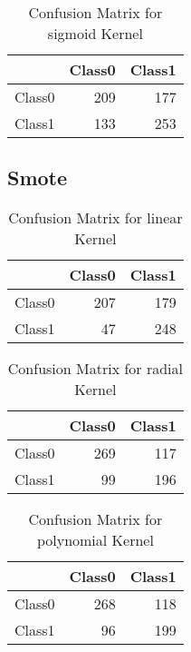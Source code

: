 \begin{table}[H]
\centering
\begin{tabular}{rrr}
  \hline
 & Class0 & Class1 \\ 
  \hline
Class0 & 209 & 177 \\ 
  Class1 & 133 & 253 \\ 
   \hline
\end{tabular}
\caption{Confusion Matrix for sigmoid Kernel} 
\end{table}

\subsection{Smote}

\begin{table}[H]
\centering
\begin{tabular}{rrr}
  \hline
 & Class0 & Class1 \\ 
  \hline
Class0 & 207 & 179 \\ 
  Class1 &  47 & 248 \\ 
   \hline
\end{tabular}
\caption{Confusion Matrix for linear Kernel} 
\end{table}

\begin{table}[H]
\centering
\begin{tabular}{rrr}
  \hline
 & Class0 & Class1 \\ 
  \hline
Class0 & 269 & 117 \\ 
  Class1 &  99 & 196 \\ 
   \hline
\end{tabular}
\caption{Confusion Matrix for radial Kernel} 
\end{table}

\begin{table}[H]
\centering
\begin{tabular}{rrr}
  \hline
 & Class0 & Class1 \\ 
  \hline
Class0 & 268 & 118 \\ 
  Class1 &  96 & 199 \\ 
   \hline
\end{tabular}
\caption{Confusion Matrix for polynomial Kernel} 
\end{table}


